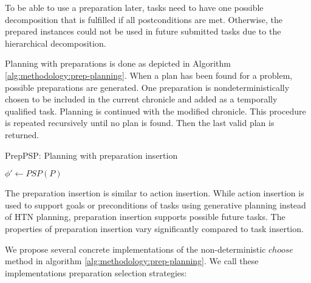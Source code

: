 To be able to use a preparation later, tasks need to have one possible decomposition that is fulfilled if all postconditions are met.
Otherwise, the prepared instances could not be used in future submitted tasks due to the hierarchical decomposition.


Planning with preparations is done as depicted in Algorithm \ref{alg:methodology:prep-planning}.
When a plan has been found for a problem, possible preparations are generated.
One preparation is nondeterministically chosen to be included in the current chronicle and added as a temporally qualified task.
Planning is continued with the modified chronicle.
This procedure is repeated recursively until no plan is found.
Then the last valid plan is returned.

\begin{algorithm}[t]
    \caption{PrepPSP: Planning with preparation insertion}
    \label{alg:methodology:prep-planning}
    $\phi' \leftarrow PSP(P)$\;
\end{algorithm}

The preparation insertion is similar to action insertion.
While action insertion is used to support goals or preconditions of tasks using generative planning instead of \ac{HTN} planning, preparation insertion supports possible future tasks.
The properties of preparation insertion vary significantly compared to task insertion.


We propose several concrete implementations of the non-deterministic $choose$ method in algorithm \ref{alg:methodology:prep-planning}.
We call these implementations preparation selection strategies:

